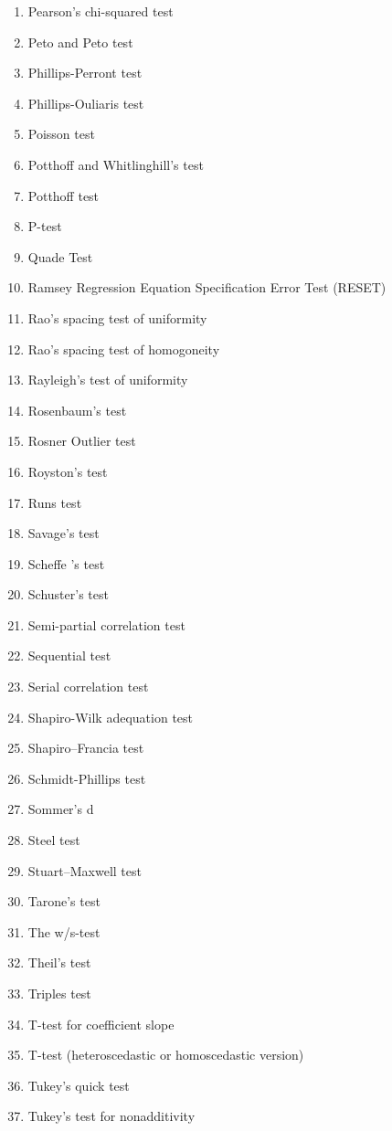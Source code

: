 \begin{itemize}
\begin{multicols}{3}
\begin{enumerate}
			\item Pearson's chi-squared test
			\item Peto and Peto test
			\item Phillips-Perront test
			\item Phillips-Ouliaris test
			\item Poisson test
			\item Potthoff and Whitlinghill's test
			\item Potthoff test
			\item P-test
			\item Quade Test
			\item Ramsey Regression Equation Specification Error Test (RESET)
			\item Rao's spacing test of uniformity
			\item Rao's spacing test of homogoneity
			\item Rayleigh's test of uniformity
			\item Rosenbaum's test
			\item Rosner Outlier test
			\item Royston's test
			\item Runs test
			\item Savage's test
			\item Scheffe 's test
			\item Schuster's test
			\item Semi-partial correlation test
			\item Sequential test
			\item Serial correlation test
			\item Shapiro-Wilk adequation test
			\item Shapiro–Francia test
			\item Schmidt-Phillips test
			\item Sommer's d 
			\item Steel test
			\item Stuart–Maxwell test
			\item Tarone's test
			\item The w/s-test
			\item Theil's test
			\item Triples test
			\item T-test for coefficient slope
			\item T-test (heteroscedastic or homoscedastic version)
			\item Tukey's quick test
			\item Tukey's test for nonadditivity

\end{enumerate}
\end{multicols}
\end{itemize}
